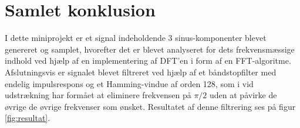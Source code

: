\section{Samlet konklusion}
I dette miniprojekt er et signal indeholdende 3 sinus-komponenter blevet genereret og samplet, hvorefter det er blevet analyseret for dets frekvensmæssige indhold ved hjælp af en implementering af DFT'en i form af en FFT-algoritme. Afslutningsvis er signalet blevet filtreret ved hjælp af et båndstopfilter med endelig impulsrespons og et Hamming-vindue af orden 128, som i vid udstrækning har formået at eliminere frekvensen på $\pi/2$ uden at påvirke de øvrige de øvrige frekvenser som ønsket. Resultatet af denne filtrering ses på figur \ref{fig:resultat}.